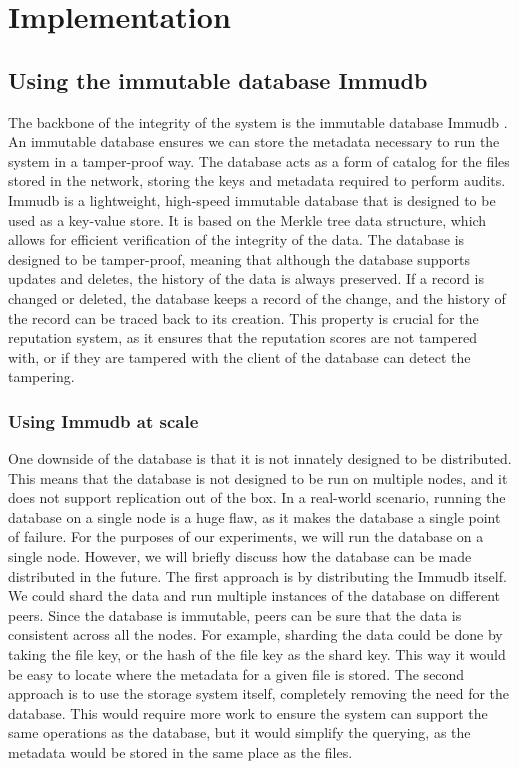 \chapter{Implementation}
\label{chapter:implementation}

\section{Using the immutable database Immudb}
\label{section:using-immudb}

The backbone of the integrity of the system is the immutable database Immudb \cite{immudb}.
An immutable database ensures we can store the metadata necessary to run the system
in a tamper-proof way.
The database acts as a form of catalog for the files stored in the network,
storing the keys and metadata required to perform audits.
Immudb is a lightweight, high-speed immutable database that is designed to be used as a key-value store.
It is based on the Merkle tree data structure, which allows for efficient verification of the integrity of the data.
The database is designed to be tamper-proof, meaning that although the database supports updates and deletes,
the history of the data is always preserved.
If a record is changed or deleted,
the database keeps a record of the change, and the history of the record can be traced back to its creation.
This property is crucial for the reputation system, as it ensures that the reputation scores are not tampered with,
or if they are tampered with the client of the database can detect the tampering.

\subsection{Using Immudb at scale}

One downside of the database is that it is not innately designed to be distributed.
This means that the database is not designed to be run on multiple nodes,
and it does not support replication out of the box.
In a real-world scenario, running the database on a single node is a huge flaw,
as it makes the database a single point of failure.
For the purposes of our experiments, we will run the database on a single node.
However, we will briefly discuss how the database can be made distributed in the future.
The first approach is by distributing the Immudb itself.
We could shard the data and run multiple instances of the database on different peers.
Since the database is immutable, peers can be sure that the data is consistent across all the nodes.
For example, sharding the data could be done by taking the file key, or the hash of the file key as the shard key.
This way it would be easy to locate where the metadata for a given file is stored.
The second approach is to use the storage system itself, completely removing the need for the database.
This would require more work to ensure the system can support the same operations as the database,
but it would simplify the querying, as the metadata would be stored in the same place as the files.

